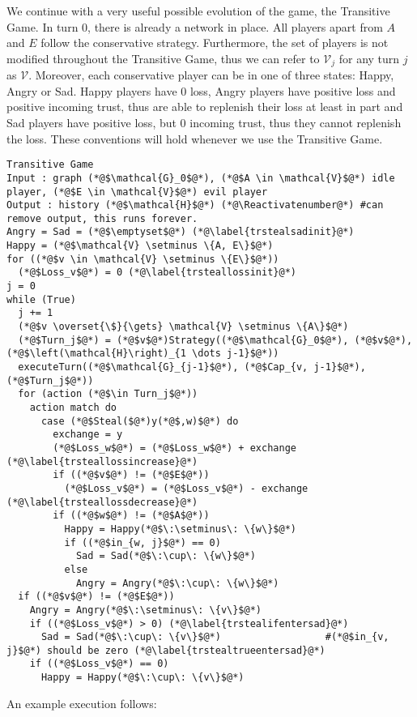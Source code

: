 \documentclass[11pt]{llncs}
\makeatletter
\newcommand*\Suppressnumber{%
  \lst@AddToHook{OnNewLine}{%
    \let\thelstnumber\relax%
     \advance\c@lstnumber-\@ne\relax%
    }%
}
\theoremstyle{definition}
\makeatother
\begin{document}
     We continue with a very useful possible evolution of the game, the Transitive Game. In turn 0, there is already a network
     in place. All players apart from $A$ and $E$ follow the conservative strategy. Furthermore, the set of players is not
     modified throughout the Transitive Game, thus we can refer to $\mathcal{V}_j$ for any turn $j$ as $\mathcal{V}$.
     Moreover, each conservative player can be in one of three states: Happy, Angry or Sad. Happy players have 0 loss, Angry
     players have positive loss and positive incoming trust, thus are able to replenish their loss at least in part and
     Sad players have positive loss, but 0 incoming trust, thus they cannot replenish the loss. These conventions will hold
     whenever we use the Transitive Game.
     \Suppressnumber
     \begin{lstlisting}[label=transitivegame, style=numbers]
Transitive Game
Input : graph (*@$\mathcal{G}_0$@*), (*@$A \in \mathcal{V}$@*) idle player, (*@$E \in \mathcal{V}$@*) evil player
Output : history (*@$\mathcal{H}$@*) (*@\Reactivatenumber@*) #can remove output, this runs forever.
Angry = Sad = (*@$\emptyset$@*) (*@\label{trstealsadinit}@*)
Happy = (*@$\mathcal{V} \setminus \{A, E\}$@*)
for ((*@$v \in \mathcal{V} \setminus \{E\}$@*))
  (*@$Loss_v$@*) = 0 (*@\label{trsteallossinit}@*)
j = 0
while (True)
  j += 1
  (*@$v \overset{\$}{\gets} \mathcal{V} \setminus \{A\}$@*)
  (*@$Turn_j$@*) = (*@$v$@*)Strategy((*@$\mathcal{G}_0$@*), (*@$v$@*), (*@$\left(\mathcal{H}\right)_{1 \dots j-1}$@*))
  executeTurn((*@$\mathcal{G}_{j-1}$@*), (*@$Cap_{v, j-1}$@*), (*@$Turn_j$@*))
  for (action (*@$\in Turn_j$@*))
    action match do
      case (*@$Steal($@*)y(*@$,w)$@*) do
        exchange = y
        (*@$Loss_w$@*) = (*@$Loss_w$@*) + exchange (*@\label{trsteallossincrease}@*)
        if ((*@$v$@*) != (*@$E$@*))
          (*@$Loss_v$@*) = (*@$Loss_v$@*) - exchange (*@\label{trsteallossdecrease}@*)
        if ((*@$w$@*) != (*@$A$@*))
          Happy = Happy(*@$\:\setminus\: \{w\}$@*)
          if ((*@$in_{w, j}$@*) == 0)
            Sad = Sad(*@$\:\cup\: \{w\}$@*)
          else
            Angry = Angry(*@$\:\cup\: \{w\}$@*)
  if ((*@$v$@*) != (*@$E$@*))
    Angry = Angry(*@$\:\setminus\: \{v\}$@*)
    if ((*@$Loss_v$@*) > 0) (*@\label{trstealifentersad}@*) 
      Sad = Sad(*@$\:\cup\: \{v\}$@*)                  #(*@$in_{v, j}$@*) should be zero (*@\label{trstealtrueentersad}@*)
    if ((*@$Loss_v$@*) == 0)
      Happy = Happy(*@$\:\cup\: \{v\}$@*)
     \end{lstlisting}
     An example execution follows:
\end{document}
